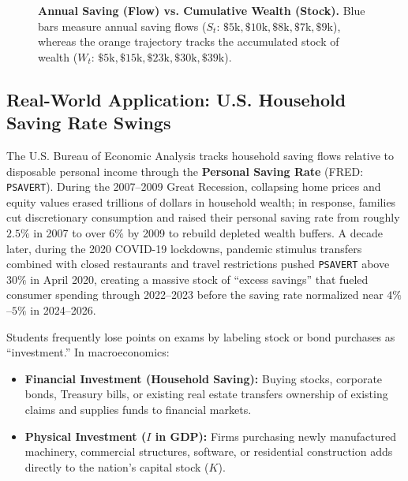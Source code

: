 \documentclass[11pt,letterpaper]{article}
\begin{document}
\begin{figure}[h!]
  \caption{\textbf{Annual Saving (Flow) vs. Cumulative Wealth (Stock).} Blue bars measure annual saving flows ($S_t$: $\$5\text{k}, \$10\text{k}, \$8\text{k}, \$7\text{k}, \$9\text{k}$), whereas the orange trajectory tracks the accumulated stock of wealth ($W_t$: $\$5\text{k}, \$15\text{k}, \$23\text{k}, \$30\text{k}, \$39\text{k}$).}
  \label{fig:ch7-saving-wealth}
\end{figure}

\subsection*{Real-World Application: U.S. Household Saving Rate Swings}
The U.S. Bureau of Economic Analysis tracks household saving flows relative to disposable personal income through the \textbf{Personal Saving Rate} (FRED: \texttt{PSAVERT}). During the 2007--2009 Great Recession, collapsing home prices and equity values erased trillions of dollars in household wealth; in response, families cut discretionary consumption and raised their personal saving rate from roughly $2.5\%$ in 2007 to over $6\%$ by 2009 to rebuild depleted wealth buffers. A decade later, during the 2020 COVID-19 lockdowns, pandemic stimulus transfers combined with closed restaurants and travel restrictions pushed \texttt{PSAVERT} above $30\%$ in April 2020, creating a massive stock of ``excess savings'' that fueled consumer spending through 2022--2023 before the saving rate normalized near $4\%$--$5\%$ in 2024--2026.

\begin{coreprinciple}
Students frequently lose points on exams by labeling stock or bond purchases as ``investment.'' In macroeconomics:
\begin{itemize}[noitemsep]
  \item \textbf{Financial Investment (Household Saving):} Buying stocks, corporate bonds, Treasury bills, or existing real estate transfers ownership of existing claims and supplies funds to financial markets.
  \item \textbf{Physical Investment ($I$ in GDP):} Firms purchasing newly manufactured machinery, commercial structures, software, or residential construction adds directly to the nation's capital stock ($K$).
\end{itemize}
\end{coreprinciple}
\end{document}
